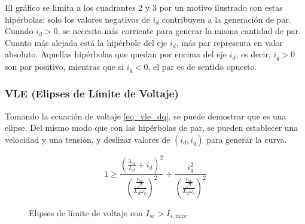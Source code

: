 El gráfico se limita a los cuadrantes 2 y 3 por un motivo ilustrado con estas hipérbolas: solo los valores negativos de \(i_d\) contribuyen a la generación de par. Cuando \(i_d>0\), se necesita más corriente para generar la misma cantidad de par. Cuanto más alejada está la hipérbole del eje \(i_d\), más par representa en valor absoluto. Aquellas hipérbolas que quedan por encima del eje \(i_d\), es decir, \(i_q > 0\) son par positivo, mientras que si \(i_q < 0\), el par es de sentido opuesto.

\subsubsection{VLE (Elipses de Límite de Voltaje)}

Tomando la ecuación de voltaje \ref{eq_vle_dq}, se puede demostrar que es una elipse. Del mismo modo que con las hipérbolas de par, se pueden establecer una velocidad y una tensión, y deslizar valores de \((i_d, i_q)\) para generar la curva.

\begin{equation}
1 \geq \frac{\left(\frac{\lambda_m}{L_d}+i_d\right)^2}{\left(\frac{\frac{V_{\text{DC}}}{\sqrt{3}}}{L_d\omega_e}\right)^2}+\frac{i_q^2}{\left(\frac{\frac{V_{\text{DC}}}{\sqrt{3}}}{L_q\omega_e}\right)^2}
\end{equation}




\begin{figure}[H]
  \centering
  \caption{Elipses de límite de voltaje con $I_{sc} > I_{s,\text{máx}}$.}
\end{figure}


